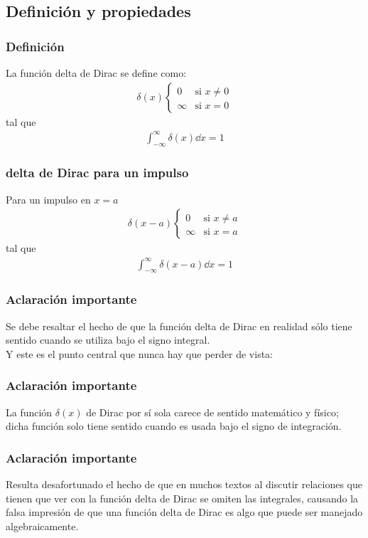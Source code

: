 \subsection{Definición y propiedades}
\begin{frame}
\frametitle{Definición}
La función delta de Dirac se define como:
\begin{align*}
\delta (x) \begin{cases}
0 & \mbox{si } x \neq 0 \\
\infty & \mbox{si } x = 0
\end{cases}
\end{align*}
tal que
\begin{align*}
\int_{-\infty}^{\infty} \delta (x) \dd{x} = 1
\end{align*}
\end{frame}
\begin{frame}
\frametitle{delta de Dirac para un impulso}
Para un impulso en $x = a$
\begin{align*}
\delta (x - a) \begin{cases}
0 & \mbox{si } x \neq a \\
\infty & \mbox{si } x = a
\end{cases}
\end{align*}
tal que
\begin{align*}
\int_{-\infty}^{\infty} \delta (x - a) \dd{x} = 1
\end{align*}
\end{frame}
\begin{frame}
\frametitle{Aclaración importante}
Se debe resaltar el hecho de que la función delta de Dirac en realidad sólo tiene sentido cuando se utiliza bajo el signo integral.
\\
\bigskip
Y este es el punto central que nunca hay que perder de vista:
\end{frame}
\begin{frame}
\frametitle{Aclaración importante}
La función $\delta(x)$ de Dirac por sí sola carece de sentido matemático y físico; dicha función solo tiene sentido cuando es usada bajo el signo de integración.
\end{frame}
\begin{frame}
\frametitle{Aclaración importante}
Resulta desafortunado el hecho de que en muchos textos al discutir relaciones que tienen que ver con la función delta de Dirac se omiten las integrales, causando la falsa impresión de que una función delta de Dirac es algo que puede ser manejado algebraicamente. 
\end{frame}
